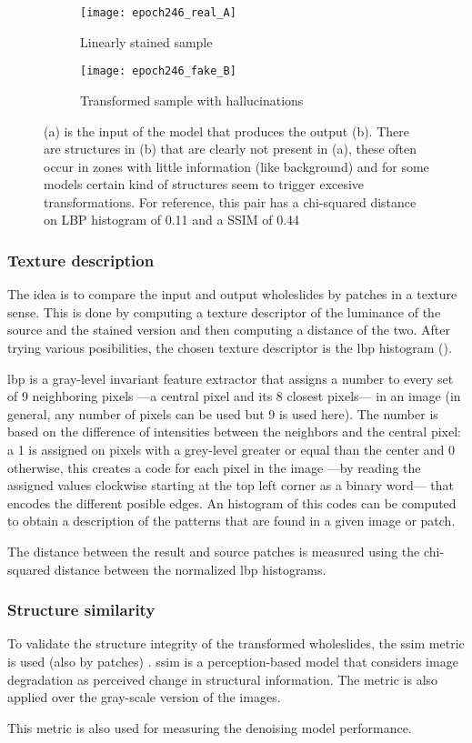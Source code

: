 \documentclass[../main.tex]{subfiles}
\begin{document}
\begin{figure}[h]
\centering
\begin{subfigure}{.5\textwidth}
  \centering
  \texttt{[image: epoch246\_real\_A]}
  \caption{Linearly stained sample}
  \label{fig:hallucination_A}
\end{subfigure}%
\begin{subfigure}{.5\textwidth}
  \centering
  \texttt{[image: epoch246\_fake\_B]}
  \caption{Transformed sample with hallucinations}
  \label{fig:hallucination_B}
\end{subfigure}
\caption{(a) is the input of the model that produces the output (b).
There are structures in (b) that are clearly not present in (a), these often
occur in zones with little information (like background) and for some models
certain kind of structures seem to trigger excesive transformations.
For reference, this pair has a chi-squared distance on LBP histogram of
0.11 and a SSIM of 0.44}
\label{fig:hallucination}
\end{figure}

\subsubsection{Texture description}
The idea is to compare the input and output wholeslides by patches in a
texture sense. This is done by computing a texture descriptor of the luminance
of the source and the stained version and then computing a distance of the two.
After trying various posibilities, the chosen texture descriptor is the
\gls{lbp} histogram (\cite{lbp}).

\gls{lbp} is a gray-level invariant feature extractor that assigns a number
to every set of 9 neighboring pixels ---a central pixel and its 8
closest pixels--- in an image (in general, any number of pixels can be used but
9 is used here). The number is based on the difference of intensities between
the neighbors and the central pixel: a 1 is assigned on pixels with a grey-level
greater or equal than the center and 0 otherwise, this creates a code for each
pixel in the image ---by reading the assigned values clockwise starting at the
top left corner as a binary word--- that encodes the different posible edges.
An histogram of this codes can be computed
to obtain a description of the patterns that are found in a given image or patch.

The distance between the result and source patches is measured using
the chi-squared distance between the normalized \gls{lbp} histograms.

\subsubsection{Structure similarity}
To validate the structure integrity of the transformed wholeslides, the
\gls{ssim} metric is used (also by patches) \parencite{Wang2004}.
\gls{ssim} is a perception-based model that considers image degradation as
perceived change in structural information. The metric is also applied over
the gray-scale version of the images.

This metric is also used for measuring the denoising model performance.
\end{document}
